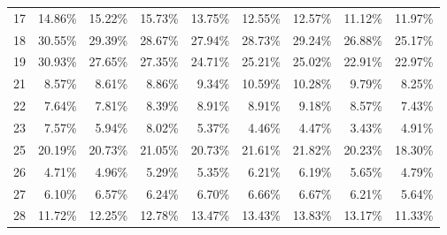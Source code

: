 \begin{table}[]
\begin{center}
\begin{tabular}{crrrrrrrr}
17    & 14.86\%                  & 15.22\%                  & 15.73\%                  & 13.75\%                  & 12.55\%                  & 12.57\%                  & 11.12\%                  & 11.97\%                     \\
18    & 30.55\%                  & 29.39\%                  & 28.67\%                  & 27.94\%                  & 28.73\%                  & 29.24\%                  & 26.88\%                  & 25.17\%                     \\
19    & 30.93\%                  & 27.65\%                  & 27.35\%                  & 24.71\%                  & 25.21\%                  & 25.02\%                  & 22.91\%                  & 22.97\%                     \\
21    & 8.57\%                   & 8.61\%                   & 8.86\%                   & 9.34\%                   & 10.59\%                  & 10.28\%                  & 9.79\%                   & 8.25\%                      \\
22    & 7.64\%                   & 7.81\%                   & 8.39\%                   & 8.91\%                   & 8.91\%                   & 9.18\%                   & 8.57\%                   & 7.43\%                      \\
23    & 7.57\%                   & 5.94\%                   & 8.02\%                   & 5.37\%                   & 4.46\%                   & 4.47\%                   & 3.43\%                   & 4.91\%                      \\
25    & 20.19\%                  & 20.73\%                  & 21.05\%                  & 20.73\%                  & 21.61\%                  & 21.82\%                  & 20.23\%                  & 18.30\%                     \\
26    & 4.71\%                   & 4.96\%                   & 5.29\%                   & 5.35\%                   & 6.21\%                   & 6.19\%                   & 5.65\%                   & 4.79\%                      \\
27    & 6.10\%                   & 6.57\%                   & 6.24\%                   & 6.70\%                   & 6.66\%                   & 6.67\%                   & 6.21\%                   & 5.64\%                      \\
28    & 11.72\%                  & 12.25\%                  & 12.78\%                  & 13.47\%                  & 13.43\%                  & 13.83\%                  & 13.17\%                  & 11.33\%                     \\

\end{tabular}
\end{center}
\end{table}
